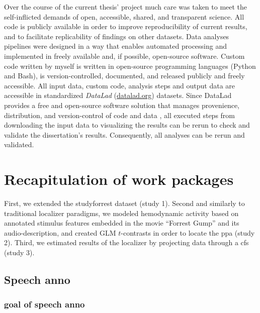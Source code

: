 %
Over the course of the current thesis' project much care was taken to meet the
self-inflicted demands of open, accessible, shared, and transparent science.
%
All code is publicly available in order to improve reproducibility of current
results, and to facilitate replicability of findings on other datasets.
Data analyses pipelines were designed in a way that enables automated processing
and implemented in freely available and, if possible, open-source software.
Custom code written by myself is written in open-source programming languages
(Python and Bash), is version-controlled, documented, and released publicly and
freely accessible.
All input data, custom code, analysis steps and output data are accessible in
standardized \textit{DataLad} (\href{www.datalad.org}{datalad.org}) datasets.
Since DataLad provides a free and open-source software solution that manages
provenience, distribution, and version-control of code and data
\citep{halchenko2021datalad}, all executed steps from downloading the input data
to visualizing the results can be rerun to check and validate the dissertation's
results.
%
Consequently, all analyses can be rerun and validated.


\section{Recapitulation of work packages}

%
First, we extended the studyforrest dataset (study 1).
%
Second  and similarly to traditional localizer paradigms, we modeled hemodynamic
activity based on annotated stimulus features embedded in the movie ``Forrest
Gump'' and its audio-description, and created GLM $t$-contrasts in order to
locate the \ac{ppa} (study 2).
%
Third, we estimated results of the localizer by projecting data through a
\ac{cfs} (study 3).



\subsection{Speech anno}

\subsubsection{goal of speech anno}

